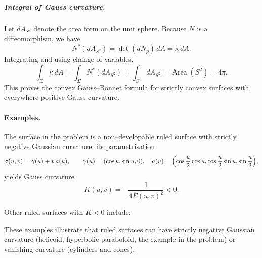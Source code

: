\documentclass[12pt,a4paper]{article}
\theoremstyle{plain}
\theoremstyle{definition}      %
\begin{document}
\subparagraph{Integral of Gauss curvature.}
Let $dA_{S^2}$ denote the area form on the unit sphere.
Because $N$ is a diffeomorphism, we have
\[
N^*(dA_{S^2}) = \det(dN_p)\,dA = \kappa\, dA.
\]
Integrating and using change of variables,
\[
\int_\Sigma \kappa\,dA
= \int_\Sigma N^*(dA_{S^2})
= \int_{S^2} dA_{S^2}
= \operatorname{Area}(S^2)
= 4\pi.
\]
This proves the convex Gauss--Bonnet formula for strictly convex surfaces
with everywhere positive Gauss curvature.

\paragraph{Examples.}
The surface in the problem is a non--developable ruled surface with strictly
negative Gaussian curvature: its parametrisation
\[
\sigma(u,v)=\gamma(u)+v\,a(u),\qquad
\gamma(u)=(\cos u,\sin u,0),\quad
a(u)=\Bigl(\cos\frac u2\cos u,\cos\frac u2\sin u,\sin\frac u2\Bigr),
\]
yields Gauss curvature
\[
K(u,v)=-\frac{1}{4E(u,v)^2}<0.
\]

Other ruled surfaces with $K<0$ include:


These examples illustrate that ruled surfaces can have strictly negative
Gaussian curvature (helicoid, hyperbolic paraboloid, the example in the
problem) or vanishing curvature (cylinders and cones).
\end{document}
